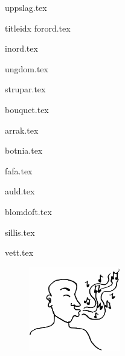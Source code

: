 \documentclass[a6paper,8pt,makeidx]{book}
\begin{document}
{uppslag.tex}
\begin{songs}{titleidx}
{forord.tex}
\sclearpage

{inord.tex}
\sclearpage

{ungdom.tex}
\sclearpage

{strupar.tex}	
\sclearpage

{bouquet.tex}	
\sclearpage

{arrak.tex}	
\sclearpage

{botnia.tex}	
\sclearpage

{fafa.tex}	
\sclearpage

{auld.tex}	
\sclearpage

{blomdoft.tex}
\sclearpage

{sillis.tex}
\sclearpage

{vett.tex}
\sclearpage


\end{songs}
\begin{figure}[h]
	\begin{center}
		\includegraphics[width=40mm]{./bilder/fardigabilder/BilderTillKapitel/visslaren.png} 
	\end{center}
\end{figure}
\renewcommand{\idxtitlefont}{\rmfamily\mdseries}
\renewcommand{\idxlyricfont}{\rmfamily\mdseries}
\renewcommand{\idxheadfont}{\sffamily\it\large}
\setlength{\idxheadwidth}{0.5cm}
\end{document}
